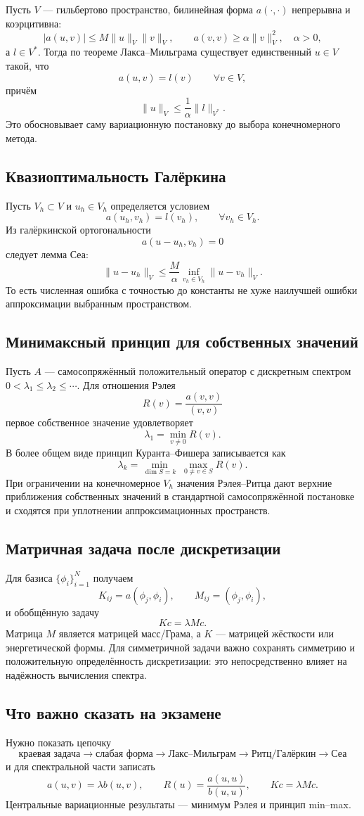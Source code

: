 Пусть $V$ --- гильбертово пространство, билинейная форма $a(\cdot,\cdot)$
непрерывна и коэрцитивна:
\[
|a(u,v)|\le M\|u\|_V\|v\|_V,
\qquad
a(v,v)\ge \alpha\|v\|_V^2,\quad \alpha>0,
\]
а $l\in V^*$. Тогда по теореме Лакса--Мильграма существует единственный
$u\in V$ такой, что
\[
a(u,v)=l(v)\qquad \forall v\in V,
\]
причём
\[
\|u\|_V\le \frac{1}{\alpha}\|l\|_{V^*}.
\]
Это обосновывает саму вариационную постановку до выбора конечномерного метода.

\subsection{Квазиоптимальность Галёркина}

Пусть $V_h\subset V$ и $u_h\in V_h$ определяется условием
\[
a(u_h,v_h)=l(v_h),\qquad \forall v_h\in V_h.
\]
Из галёркинской ортогональности
\[
a(u-u_h,v_h)=0
\]
следует лемма Сеа:
\[
\boxed{
\|u-u_h\|_V\le\frac{M}{\alpha}
\inf_{v_h\in V_h}\|u-v_h\|_V.}
\]
То есть численная ошибка с точностью до константы не хуже наилучшей ошибки
аппроксимации выбранным пространством.

\subsection{Минимаксный принцип для собственных значений}

Пусть $A$ --- самосопряжённый положительный оператор с дискретным спектром
$0<\lambda_1\le\lambda_2\le\cdots$. Для отношения Рэлея
\[
R(v)=\frac{a(v,v)}{(v,v)}
\]
первое собственное значение удовлетворяет
\[
\lambda_1=\min_{v\ne0}R(v).
\]
В более общем виде принцип Куранта--Фишера записывается как
\[
\lambda_k=
\min_{\dim S=k}\;\max_{0\ne v\in S}R(v).
\]
При ограничении на конечномерное $V_h$ значения Рэлея--Ритца дают верхние
приближения собственных значений в стандартной самосопряжённой постановке и
сходятся при уплотнении аппроксимационных пространств.

\subsection{Матричная задача после дискретизации}

Для базиса $\{\phi_i\}_{i=1}^{N}$ получаем
\[
K_{ij}=a(\phi_j,\phi_i),\qquad
M_{ij}=(\phi_j,\phi_i),
\]
и обобщённую задачу
\[
\boxed{Kc=\lambda Mc.}
\]
Матрица $M$ является матрицей масс/Грама, а $K$ --- матрицей жёсткости или
энергетической формы. Для симметричной задачи важно сохранять симметрию и
положительную определённость дискретизации: это непосредственно влияет на
надёжность вычисления спектра.


\subsection{Что важно сказать на экзамене}

Нужно показать цепочку
\[
\boxed{
\text{краевая задача}
\rightarrow
\text{слабая форма}
\rightarrow
\text{Лакс--Мильграм}
\rightarrow
\text{Ритц/Галёркин}
\rightarrow
\text{Сеа}}
\]
и для спектральной части записать
\[
a(u,v)=\lambda b(u,v),
\qquad
R(u)=\frac{a(u,u)}{b(u,u)},
\qquad
Kc=\lambda Mc.
\]
Центральные вариационные результаты --- минимум Рэлея и принцип min--max.

\newpage
